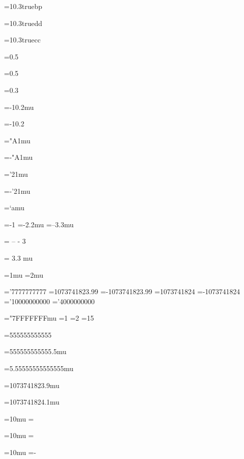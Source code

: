 =10.3truebp
\showthe{}

=10.3truedd
\showthe{}

=10.3truecc
\showthe{}

=0.5
\showthe{}

=0.5
\showthe{}

=0.3
\showthe{}

=-10.2mu
\showthe{}

=-10.2
\showthe{}

="A1mu
\showthe{}

=-"A1mu
\showthe{}

='21mu
\showthe{}

=-'21mu
\showthe{}

=`amu
\showthe{}

=-1
\showthe{}
=-2.2mu
\showthe{}
=--3.3mu
\showthe{}

  =  -- - 3  
\showthe{}

 = 3.3  mu
\showthe{}

=1mu
=2mu

='7777777777
\showthe{}
=1073741823.99
\showthe{}
=-1073741823.99
\showthe{}
=1073741824
\showthe{}
=-1073741824
\showthe{}
='10000000000
\showthe{}
='4000000000
\showthe{}

="7FFFFFFFmu
=1
\showthe{}
=2
\showthe{}
=15
\showthe{}

=555555555555
\showthe{}

=555555555555.5mu
\showthe{}

=5.55555555555555mu
\showthe{}

=1073741823.9mu
\showthe{}

=1073741824.1mu
\showthe{}

=10mu
=\relax\relax
\showthe{}

=10mu
=\relax
\showthe{}

=10mu
=-\relax
\showthe{}

